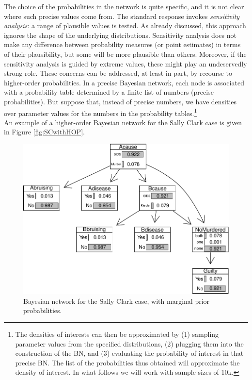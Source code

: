\documentclass[
  10pt,
  dvipsnames,enabledeprecatedfontcommands]{scrartcl}
\begin{document}
The choice of the probabilities in the network is quite specific, and it
is not clear where such precise values come from. The standard response
invokes \emph{sensitivity analysis}: a range of plausible values is
tested. As already discussed, this approach ignores the shape of the
underlying distributions. Sensitivity analysis does not make any
difference between probability measures (or point estimates) in terms of
their plausibility, but some will be more plausible than others.
Moreover, if the sensitivity analysis is guided by extreme values, these
might play an undeservedly strong role. These concerns can be addressed,
at least in part, by recourse to higher-order probabilities. In a
precise Bayesian network, each node is associated with a probability
table determined by a finite list of numbers (precise probabilities).
But suppose that, instead of precise numbers, we have densities over
parameter values for the numbers in the probability tables.\footnote{The
  densities of interests can then be approximated by (1) sampling
  parameter values from the specified distributions, (2) plugging them
  into the construction of the BN, and (3) evaluating the probability of
  interest in that precise BN. The list of the probabilities thus
  obtained will approximate the density of interest. In what follows we
  will work with sample sizes of 10k.}\\
An example of a higher-order Bayesian network for the Sally Clark case
is given in Figure \ref{fig:SCwithHOP}.

\begin{figure}[H]

\begin{center}\includegraphics[width=0.5\linewidth]{imprecision_philosophical_paper._files/figure-latex/scBNplot2-1} \end{center}
\caption{Bayesian network for the Sally Clark case, with marginal prior probabilities.}
\label{fig:scBNplot}
\end{figure}
\end{document}
